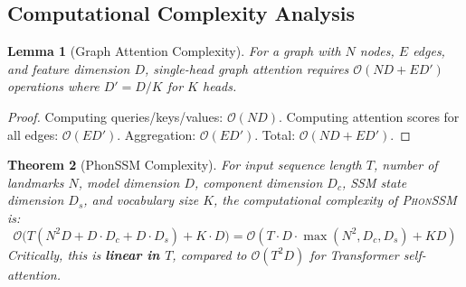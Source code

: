 \documentclass{article}
\newtheorem{theorem}{Theorem}[section]
\newtheorem{lemma}[theorem]{Lemma}
\theoremstyle{definition}
\theoremstyle{remark}
\newcommand{\phonssm}{\textsc{PhonSSM}}
\begin{document}
\subsection{Computational Complexity Analysis}

\begin{lemma}[Graph Attention Complexity]
\label{lemma:gat_complexity}
For a graph with $N$ nodes, $E$ edges, and feature dimension $D$, single-head graph attention requires $\mathcal{O}(ND + ED')$ operations where $D' = D/K$ for $K$ heads.
\end{lemma}

\begin{proof}
Computing queries/keys/values: $\mathcal{O}(ND)$. Computing attention scores for all edges: $\mathcal{O}(ED')$. Aggregation: $\mathcal{O}(ED')$. Total: $\mathcal{O}(ND + ED')$.
\end{proof}

\begin{theorem}[PhonSSM Complexity]
\label{thm:complexity}
For input sequence length $T$, number of landmarks $N$, model dimension $D$, component dimension $D_c$, SSM state dimension $D_s$, and vocabulary size $K$, the computational complexity of \phonssm{} is:
\begin{equation}
\mathcal{O}\big(T(N^2 D + D \cdot D_c + D \cdot D_s) + K \cdot D\big) = \mathcal{O}(T \cdot D \cdot \max(N^2, D_c, D_s) + KD)
\end{equation}
Critically, this is \textbf{linear in $T$}, compared to $\mathcal{O}(T^2 D)$ for Transformer self-attention.
\end{theorem}
\end{document}
